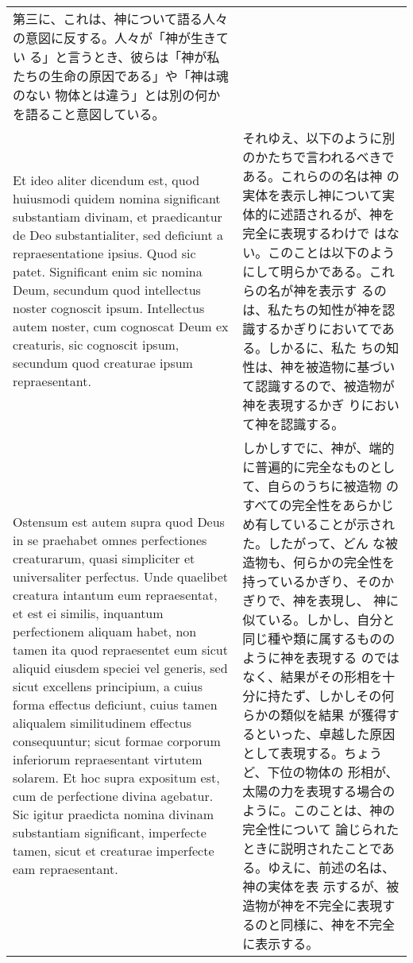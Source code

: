 \documentclass[10pt]{jsarticle} %
\begin{document}
\begin{longtable}{p{21em}p{21em}}
第三に、これは、神について語る人々の意図に反する。人々が「神が生きてい
る」と言うとき、彼らは「神が私たちの生命の原因である」や「神は魂のない
物体とは違う」とは別の何かを語ること意図している。



\\

Et ideo aliter dicendum est, quod huiusmodi quidem nomina
significant substantiam divinam, et praedicantur de Deo substantialiter,
sed deficiunt a repraesentatione ipsius. Quod sic patet. Significant
enim sic nomina Deum, secundum quod intellectus noster cognoscit
ipsum. Intellectus autem noster, cum cognoscat Deum ex creaturis, sic
cognoscit ipsum, secundum quod creaturae ipsum repraesentant. 


&

それゆえ、以下のように別のかたちで言われるべきである。これらのの名は神
の実体を表示し神について実体的に述語されるが、神を完全に表現するわけで
はない。このことは以下のようにして明らかである。これらの名が神を表示す
るのは、私たちの知性が神を認識するかぎりにおいてである。しかるに、私た
ちの知性は、神を被造物に基づいて認識するので、被造物が神を表現するかぎ
りにおいて神を認識する。

\\

Ostensum est autem supra quod Deus in se praehabet omnes perfectiones
creaturarum, quasi simpliciter et universaliter perfectus. Unde
quaelibet creatura intantum eum repraesentat, et est ei similis,
inquantum perfectionem aliquam habet, non tamen ita quod repraesentet
eum sicut aliquid eiusdem speciei vel generis, sed sicut excellens
principium, a cuius forma effectus deficiunt, cuius tamen aliqualem
similitudinem effectus consequuntur; sicut formae corporum inferiorum
repraesentant virtutem solarem. Et hoc supra expositum est, cum de
perfectione divina agebatur. Sic igitur praedicta nomina divinam
substantiam significant, imperfecte tamen, sicut et creaturae
imperfecte eam repraesentant.

&

しかしすでに、神が、端的に普遍的に完全なものとして、自らのうちに被造物
のすべての完全性をあらかじめ有していることが示された。したがって、どん
な被造物も、何らかの完全性を持っているかぎり、そのかぎりで、神を表現し、
神に似ている。しかし、自分と同じ種や類に属するもののように神を表現する
のではなく、結果がその形相を十分に持たず、しかしその何らかの類似を結果
が獲得するといった、卓越した原因として表現する。ちょうど、下位の物体の
形相が、太陽の力を表現する場合のように。このことは、神の完全性について
論じられたときに説明されたことである。ゆえに、前述の名は、神の実体を表
示するが、被造物が神を不完全に表現するのと同様に、神を不完全に表示する。




\end{longtable}
\end{document}
